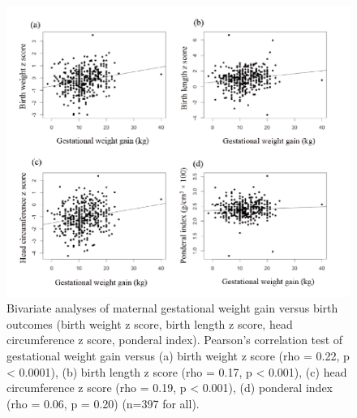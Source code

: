 \begin{figure}
  \centering
    \label{fig:Fig324}
  \includegraphics[scale=1]{Figures/Fig324.pdf}
  \caption[Bivariate analyses of maternal gestational weight gain versus birth outcomes (birth weight z score, birth length z score, head circumference z score, ponderal index)]{Bivariate analyses of maternal gestational weight gain versus birth outcomes (birth weight z score, birth length z score, head circumference z score, ponderal index). Pearson's correlation test of gestational weight gain versus (a) birth weight z score (rho = 0.22, p < 0.0001), (b) birth length z score (rho = 0.17, p < 0.001), (c) head circumference z score (rho = 0.19, p < 0.001), (d) ponderal index (rho = 0.06, p = 0.20) (n=397 for all).}
\end{figure}


